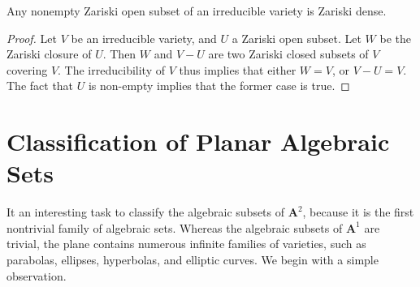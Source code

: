 \begin{theorem}
    Any nonempty Zariski open subset of an irreducible variety is Zariski dense.
\end{theorem}
\begin{proof}
    Let $V$ be an irreducible variety, and $U$ a Zariski open subset. Let $W$ be the Zariski closure of $U$. Then $W$ and $V - U$ are two Zariski closed subsets of $V$ covering $V$. The irreducibility of $V$ thus implies that either $W = V$, or $V - U = V$. The fact that $U$ is non-empty implies that the former case is true.
\end{proof}


%
%


\section{Classification of Planar Algebraic Sets}

It an interesting task to classify the algebraic subsets of $\mathbf{A}^2$, because it is the first nontrivial family of algebraic sets. Whereas the algebraic subsets of $\mathbf{A}^1$ are trivial, the plane contains numerous infinite families of varieties, such as parabolas, ellipses, hyperbolas, and elliptic curves. We begin with a simple observation.

